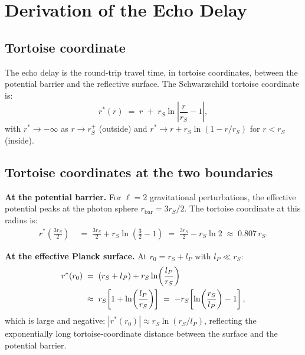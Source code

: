 \documentclass[12pt]{article}
\newcommand{\lP}{l_P}
\newcommand{\rS}{r_S}
\newcommand{\rstar}{r^*}
\begin{document}
\section{Derivation of the Echo Delay}
\label{sec:tortoise}

\subsection{Tortoise coordinate}

The echo delay is the round-trip travel time, in tortoise coordinates,
between the potential barrier and the reflective surface.  The Schwarzschild
tortoise coordinate is:
\begin{equation}
  \rstar(r) \;=\; r \;+\; \rS\ln\!\left|\frac{r}{\rS} - 1\right|,
  \label{eq:tortoise}
\end{equation}
with $\rstar \to -\infty$ as $r \to \rS^+$ (outside) and
$\rstar \to r + \rS\ln(1 - r/\rS)$ for $r < \rS$ (inside).

\subsection{Tortoise coordinates at the two boundaries}

\textbf{At the potential barrier.}
For $\ell = 2$ gravitational perturbations, the effective potential peaks
at the photon sphere $r_{\mathrm{bar}} = 3\rS/2$.  The tortoise coordinate
at this radius is:
\begin{align}
  \rstar({\textstyle\frac{3\rS}{2}})
  &\;=\; \frac{3\rS}{2} + \rS\ln\!\left(\frac{3}{2}-1\right)
  \;=\; \frac{3\rS}{2} - \rS\ln 2
  \;\approx\; 0.807\,\rS.
  \label{eq:rstar_bar}
\end{align}

\textbf{At the effective Planck surface.}
At $r_0 = \rS + \lP$ with $\lP \ll \rS$:
\begin{align}
  \rstar(r_0)
  &\;=\; (\rS + \lP) + \rS\ln\!\left(\frac{\lP}{\rS}\right) \notag\\
  &\;\approx\; \rS\!\left[1 + \ln\!\left(\frac{\lP}{\rS}\right)\right]
  \;=\; -\rS\!\left[\ln\!\left(\frac{\rS}{\lP}\right) - 1\right],
  \label{eq:rstar_0}
\end{align}
which is large and negative: $|\rstar(r_0)| \approx \rS\ln(\rS/\lP)$,
reflecting the exponentially long tortoise-coordinate distance between
the surface and the potential barrier.
\end{document}
